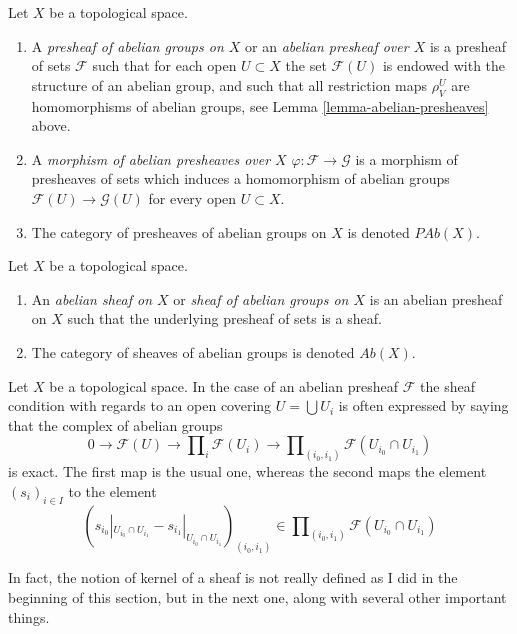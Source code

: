 \begin{definition}
\label{definition-abelian-presheaves}
Let $X$ be a topological space.
\begin{enumerate}
\item A {\it presheaf of abelian groups on $X$} or an
{\it abelian presheaf over $X$}
is a presheaf of sets $\mathcal{F}$ such that for each open
$U \subset X$ the set $\mathcal{F}(U)$ is endowed with
the structure of an abelian group, and such that all restriction
maps $\rho^U_V$ are homomorphisms of abelian groups, see
Lemma \ref{lemma-abelian-presheaves} above.
\item A {\it morphism of abelian presheaves over $X$}
$\varphi : \mathcal{F} \to \mathcal{G}$ is a morphism of presheaves
of sets which induces
a homomorphism of abelian groups $\mathcal{F}(U) \to \mathcal{G}(U)$
for every open $U \subset X$.
\item The category of presheaves of abelian groups on $X$ is denoted
$\textit{PAb}(X)$.
\end{enumerate}
\end{definition}

\medskip\noindent
\begin{definition}
\label{definition-abelian-sheaf}
Let $X$ be a topological space.
\begin{enumerate}
\item An {\it abelian sheaf on $X$} or
{\it sheaf of abelian groups on $X$}
is an abelian presheaf on $X$ such that the underlying presheaf of
sets is a sheaf.
\item The category of sheaves of abelian groups
is denoted $\textit{Ab}(X)$.
\end{enumerate}
\end{definition}

\noindent
Let $X$ be a topological space.
In the case of an abelian presheaf $\mathcal{F}$ the sheaf
condition with regards to an open covering $U = \bigcup U_i$
is often expressed by saying that the complex of abelian groups
$$
0 \to \mathcal{F}(U)
\to \prod\nolimits_i \mathcal{F}(U_i)
\to \prod\nolimits_{(i_0, i_1)} \mathcal{F}(U_{i_0} \cap U_{i_1})
$$
is exact. The first map is the usual one, whereas the second
maps the element $(s_i)_{i \in I}$ to the element
$$
(
s_{i_0}|_{U_{i_0} \cap U_{i_1}} -
s_{i_1}|_{U_{i_0} \cap U_{i_1}}
)_{(i_0, i_1)}
\in \prod\nolimits_{(i_0, i_1)} \mathcal{F}(U_{i_0} \cap U_{i_1})
$$

In fact, the notion of kernel of a sheaf
is not really defined as I did in the beginning of this section,
but in the next one, along with several other
important things.


